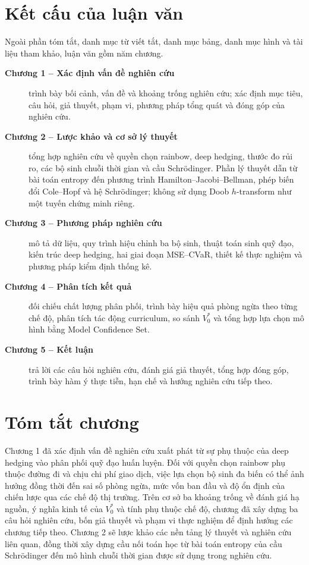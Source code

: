 \section{Kết cấu của luận văn}
\label{sec:ket-cau-luan-van}

Ngoài phần tóm tắt, danh mục từ viết tắt, danh mục bảng, danh mục hình và tài
liệu tham khảo, luận văn gồm năm chương.

\begin{description}
    \item[\textbf{Chương 1 -- Xác định vấn đề nghiên cứu}] trình bày bối cảnh,
    vấn đề và khoảng trống nghiên cứu; xác định mục tiêu, câu hỏi, giả thuyết,
    phạm vi, phương pháp tổng quát và đóng góp của nghiên cứu.

    \item[\textbf{Chương 2 -- Lược khảo và cơ sở lý thuyết}] tổng hợp nghiên
    cứu về quyền chọn rainbow, deep hedging, thước đo rủi ro, các bộ sinh chuỗi
    thời gian và cầu Schrödinger. Phần lý thuyết dẫn từ bài toán entropy đến
    phương trình Hamilton--Jacobi--Bellman, phép biến đổi Cole--Hopf và hệ
    Schrödinger; không sử dụng Doob $h$-transform như một tuyến chứng minh riêng.

    \item[\textbf{Chương 3 -- Phương pháp nghiên cứu}] mô tả dữ liệu, quy
    trình hiệu chỉnh ba bộ sinh, thuật toán sinh quỹ đạo, kiến trúc deep
    hedging, hai giai đoạn MSE--CVaR, thiết kế thực nghiệm và phương pháp kiểm
    định thống kê.

    \item[\textbf{Chương 4 -- Phân tích kết quả}] đối chiếu chất lượng phân
    phối, trình bày hiệu quả phòng ngừa theo từng chế độ, phân tích tác động
    curriculum, so sánh $V_0^{*}$ và tổng hợp lựa chọn mô hình bằng Model
    Confidence Set.

    \item[\textbf{Chương 5 -- Kết luận}] trả lời các câu hỏi nghiên cứu, đánh
    giá giả thuyết, tổng hợp đóng góp, trình bày hàm ý thực tiễn, hạn chế và
    hướng nghiên cứu tiếp theo.
\end{description}

\section{Tóm tắt chương}

Chương 1 đã xác định vấn đề nghiên cứu xuất phát từ sự phụ thuộc của deep
hedging vào phân phối quỹ đạo huấn luyện. Đối với quyền chọn rainbow phụ thuộc
đường đi và chịu chi phí giao dịch, việc lựa chọn bộ sinh đa biến có thể ảnh
hưởng đồng thời đến sai số phòng ngừa, mức vốn ban đầu và độ ổn định của chiến
lược qua các chế độ thị trường. Trên cơ sở ba khoảng trống về đánh giá hạ
nguồn, ý nghĩa kinh tế của $V_0^{*}$ và tính phụ thuộc chế độ, chương đã xây
dựng ba câu hỏi nghiên cứu, bốn giả thuyết và phạm vi thực nghiệm để định hướng
các chương tiếp theo. Chương 2 sẽ lược khảo các nền tảng lý thuyết và nghiên
cứu liên quan, đồng thời xây dựng cầu nối toán học từ bài toán entropy của cầu
Schrödinger đến mô hình chuỗi thời gian được sử dụng trong nghiên cứu.
